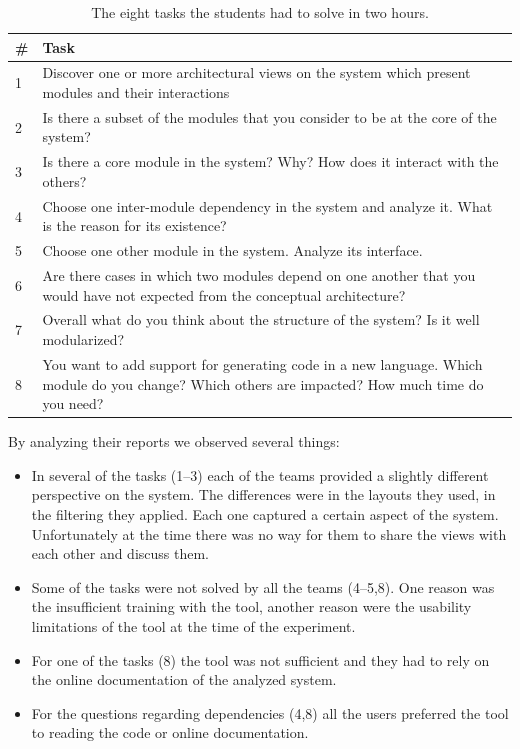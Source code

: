 \documentclass[preprint,12pt]{elsarticle}
\begin{document}
\begin{table}[t!]
\begin{center}
\begin{tabular}{l p{\linewidth}}
\# & \footnotesize{Task} \\ \hline
\footnotesize{1} & \footnotesize{Discover one or more architectural views on the system which present modules and their interactions} \\
\footnotesize{2} & \footnotesize {Is there a subset of the modules that you consider to be at the core of the system?} \\
\footnotesize{3} & \footnotesize {Is there a core module in the system? Why? How does it interact with the others?} \\
\footnotesize{4} & \footnotesize {Choose one inter-module dependency in the system and analyze it. What is the reason for its existence?} \\
\footnotesize{5} & \footnotesize {Choose one other module in the system. Analyze its interface.} \\
\footnotesize{6} & \footnotesize {Are there cases in which two modules depend on one another that you would have not expected from the conceptual architecture?} \\
\footnotesize{7} & \footnotesize {Overall what do you think about the structure of the system? Is it well modularized?} \\
\footnotesize{8} & \footnotesize {You want to add support for generating code in a new language. Which module do you change? Which others are impacted? How much time do you need?} \\ \hline
\end{tabular}
\caption{The eight tasks the students had to solve in two hours.}
\label{tab:questions}
\end{center}
\end{table}

By analyzing their reports we observed several things:

\begin{itemize}
\item In several of the tasks (1--3) each of the teams provided a slightly different perspective on the system. The differences were in the layouts they used, in the filtering they applied. Each one captured a certain aspect of the system. Unfortunately at the time there was no way for them to share the views with each other and discuss them.
\item Some of the tasks were not solved by all the teams (4--5,8). One reason was the insufficient training with the tool, another reason were the usability limitations of the tool at the time of the experiment. %
\item For one of the tasks (8) the tool was not sufficient and they had to rely on the online documentation of the analyzed system. 
\item For the questions regarding dependencies (4,8) all the users preferred the tool to reading the code or online documentation.
\end{itemize}
\end{document}
